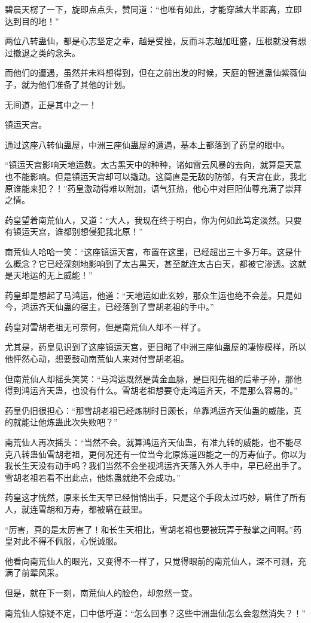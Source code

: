 \begin{this_body}
碧晨天楞了一下，旋即点点头，赞同道：“也唯有如此，才能穿越大半距离，立即达到目的地！”

两位八转蛊仙，都是心志坚定之辈，越是受挫，反而斗志越加旺盛，压根就没有想过撤退之类的念头。

而他们的遭遇，虽然并未料想得到，但在之前出发的时候，天庭的智道蛊仙紫薇仙子，就为他们准备了其他的计划。

无间道，正是其中之一！

镇运天宫。

通过这座八转仙蛊屋，中洲三座仙蛊屋的遭遇，基本上都落到了药皇的眼中。

“镇运天宫影响天地运数。太古黑天中的种种，诸如雷云风暴的去向，就算是天意也不能影响。但是镇运天宫却可以撬动。这简直是无敌的防御，有天宫在此，我北原谁能来犯？！”药皇激动得难以附加，语气狂热，他心中对巨阳仙尊充满了崇拜之情。

药皇望着南荒仙人，又道：“大人，我现在终于明白，你为何如此笃定淡然。只要有镇运天宫，谁都别想侵犯我北原！”

南荒仙人哈哈一笑：“这座镇运天宫，布置在这里，已经超出三十多万年。这是什么概念？它已经深刻地影响到了太古黑天，甚至就连太古白天，都被它渗透。这就是天地运的无上威能！”

药皇却是想起了马鸿运，他道：“天地运如此玄妙，那众生运也绝不会差。只是如今，鸿运齐天仙蛊的宿主，已经落到了雪胡老祖的手中。”

药皇对雪胡老祖无可奈何，但是南荒仙人却不一样了。

尤其是，药皇见识到了这座镇运天宫，更目睹了中洲三座仙蛊屋的凄惨模样，所以他怦然心动，想要鼓动南荒仙人来对付雪胡老祖。

但南荒仙人却摇头笑笑：“马鸿运既然是黄金血脉，是巨阳先祖的后辈子孙，那他得到鸿运齐天蛊，也没有什么。雪胡老祖想要夺走鸿运齐天，不是那么容易的。”

药皇仍旧很担心：“那雪胡老祖已经炼制时日颇长，单靠鸿运齐天仙蛊的威能，真的就能让他炼蛊此次失败吧？”

南荒仙人再次摇头：“当然不会。就算鸿运齐天仙蛊，有准九转的威能，也不能尽克八转蛊仙雪胡老祖，更何况还有一位当今北原炼道四能之一的万寿仙子。你以为我长生天没有动手吗？我们当然不会坐视鸿运齐天落入外人手中，早已经出手了。雪胡老祖若看不出此点，他炼蛊就绝不会成功。”

药皇这才恍然，原来长生天早已经悄悄出手，只是这个手段太过巧妙，瞒住了所有人，就连雪胡和万寿，都被瞒在鼓里。

“厉害，真的是太厉害了！和长生天相比，雪胡老祖也要被玩弄于鼓掌之间啊。”药皇对此不得不佩服，心悦诚服。

他看向南荒仙人的眼光，又变得不一样了，只觉得眼前的南荒仙人，深不可测，充满了前辈风采。

但是，就在下一刻，南荒仙人的脸色，却忽然一变。

南荒仙人惊疑不定，口中低呼道：“怎么回事？这些中洲蛊仙怎么会忽然消失？！”

\end{this_body}

